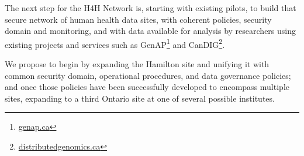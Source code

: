 \documentclass[twoside,symmetric,sfsidenotes,notoc]{tufte-book}
\begin{document}
The next step for the H4H Network is, starting with existing pilots, to build 
that secure network of human health data sites, with coherent policies, security 
domain and monitoring, and with data available for analysis by researchers using
existing projects and services such as GenAP\footnote{\href{https://genap.ca}{genap.ca}}
and CanDIG\footnote{\href{https://www.distributedgenomics.ca}{distributedgenomics.ca}}.

We propose to begin by expanding the Hamilton site and unifying it with common
security domain, operational procedures, and data governance policies; and once those
policies have been successfully developed to encompass multiple sites, expanding 
to a third Ontario site at one of several possible institutes.


\backmatter





\printindex
\end{document}
